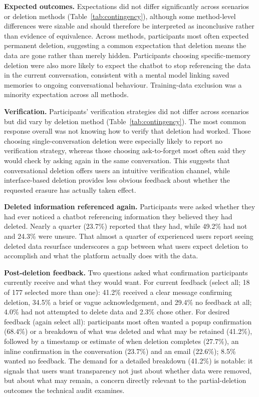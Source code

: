 \documentclass[conference,compsoc]{IEEEtran}
\begin{document}
\textbf{Expected outcomes.} Expectations did not differ significantly across scenarios or deletion methods (Table~\ref{tab:contingency}), although some method-level differences were sizable and should therefore be interpreted as inconclusive rather than evidence of equivalence. Across methods, participants most often expected permanent deletion, suggesting a common expectation that deletion means the data are gone rather than merely hidden. Participants choosing specific-memory deletion were also more likely to expect the chatbot to stop referencing the data in the current conversation, consistent with a mental model linking saved memories to ongoing conversational behaviour. Training-data exclusion was a minority expectation across all methods.

\textbf{Verification.} Participants' verification strategies did not differ across scenarios but did vary by deletion method (Table~\ref{tab:contingency}). The most common response overall was not knowing how to verify that deletion had worked. Those choosing single-conversation deletion were especially likely to report no verification strategy, whereas those choosing ask-to-forget most often said they would check by asking again in the same conversation. This suggests that conversational deletion offers users an intuitive verification channel, while interface-based deletion provides less obvious feedback about whether the requested erasure has actually taken effect.

\textbf{Deleted information referenced again.} Participants were asked whether they had ever noticed a chatbot referencing information they believed they had deleted. Nearly a quarter (23.7\%) reported that they had, while 49.2\% had not and 24.3\% were unsure. That almost a quarter of experienced users report seeing deleted data resurface underscores a gap between what users expect deletion to accomplish and what the platform actually does with the data.

\textbf{Post-deletion feedback.} Two questions asked what confirmation participants currently receive and what they would want. For current feedback (select all; 18 of 177 selected more than one): 41.2\% received a clear message confirming deletion, 34.5\% a brief or vague acknowledgement, and 29.4\% no feedback at all; 4.0\% had not attempted to delete data and 2.3\% chose other. For desired feedback (again select all): participants most often wanted a popup confirmation (68.4\%) or a breakdown of what was deleted and what may be retained (41.2\%), followed by a timestamp or estimate of when deletion completes (27.7\%), an inline confirmation in the conversation (23.7\%) and an email (22.6\%); 8.5\% wanted no feedback. The demand for a detailed breakdown (41.2\%) is notable: it signals that users want transparency not just about whether data were removed, but about what may remain, a concern directly relevant to the partial-deletion outcomes the technical audit examines.
\end{document}
